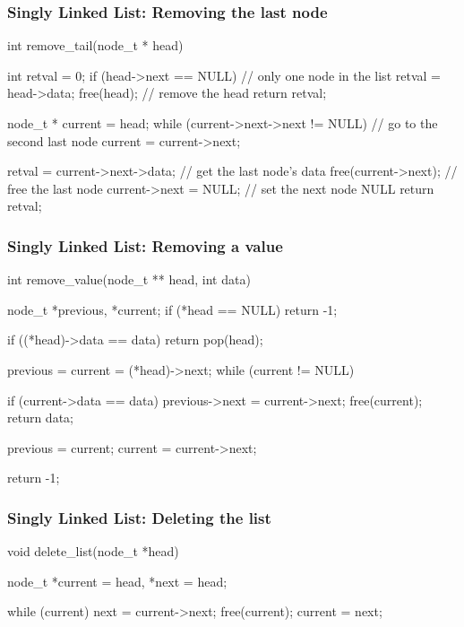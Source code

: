 \documentclass[newPxFont,sthlmFooter,nooffset]{beamer}
\begin{document}
\begin{frame}[t, fragile]
  \frametitle{Singly Linked List: Removing the last node}
\begin{ncodedef}
int remove_tail(node_t * head) {
    int retval = 0;
    if (head->next == NULL) { // only one node in the list
        retval = head->data;
        free(head);           // remove the head
        return retval;
    }

    node_t * current = head;
    while (current->next->next != NULL) { // go to the second last node
        current = current->next;
    }

    retval = current->next->data; // get the last node's data
    free(current->next);         // free the last node
    current->next = NULL;        // set the next node NULL
    return retval;

}  
\end{ncodedef}
\end{frame}


\begin{frame}[t, fragile]
  \frametitle{Singly Linked List: Removing a value }
  \begin{ncodedef}
int remove_value(node_t ** head, int data) {
    node_t *previous, *current;
    if (*head == NULL)
        return -1;

    if ((*head)->data == data) 
        return pop(head);

    previous = current = (*head)->next;
    while (current != NULL) {
        if (current->data == data) {
            previous->next = current->next;
            free(current);
            return data;
        }

        previous = current;
        current  = current->next;
    }
    return -1;
}    
  \end{ncodedef}
  
\end{frame}


\begin{frame}[t, fragile]
  \frametitle{Singly Linked List: Deleting the list }
  \begin{ncodedef}
void delete_list(node_t *head) {
    node_t  *current = head, 
            *next = head;

    while (current) {
        next = current->next;
        free(current);
        current = next;
    }
}    
  \end{ncodedef}
\end{frame}
\end{document}
